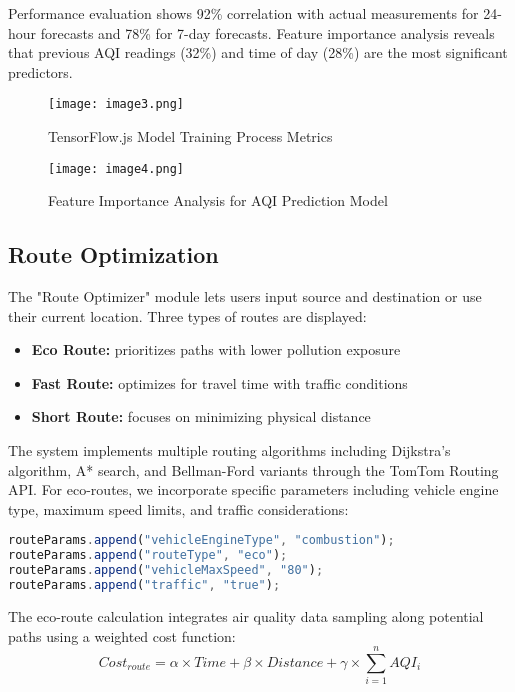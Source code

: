 \documentclass[conference]{IEEEtran}
\begin{document}
Performance evaluation shows 92\% correlation with actual measurements for 24-hour forecasts and 78\% for 7-day forecasts. Feature importance analysis reveals that previous AQI readings (32\%) and time of day (28\%) are the most significant predictors.

\begin{figure}[htbp]
    \centering
    \texttt{[image: image3.png]}
    \caption{TensorFlow.js Model Training Process Metrics}
    \label{fig:training-metrics}
\end{figure}

\begin{figure}[htbp]
    \centering
    \texttt{[image: image4.png]}
    \caption{Feature Importance Analysis for AQI Prediction Model}
    \label{fig:feature-importance}
\end{figure}

\subsection{Route Optimization}
The "Route Optimizer" module lets users input source and destination or use their current location. Three types of routes are displayed:
\begin{itemize}
    \item \textbf{Eco Route:} prioritizes paths with lower pollution exposure
    \item \textbf{Fast Route:} optimizes for travel time with traffic conditions
    \item \textbf{Short Route:} focuses on minimizing physical distance
\end{itemize}

The system implements multiple routing algorithms including Dijkstra's algorithm, A* search, and Bellman-Ford variants through the TomTom Routing API. For eco-routes, we incorporate specific parameters including vehicle engine type, maximum speed limits, and traffic considerations:

\begin{lstlisting}[language=JavaScript]
routeParams.append("vehicleEngineType", "combustion");
routeParams.append("routeType", "eco");
routeParams.append("vehicleMaxSpeed", "80"); 
routeParams.append("traffic", "true");
\end{lstlisting}

The eco-route calculation integrates air quality data sampling along potential paths using a weighted cost function:
\begin{equation}
Cost_{route} = \alpha \times Time + \beta \times Distance + \gamma \times \sum_{i=1}^{n} AQI_i
\end{equation}
\end{document}
